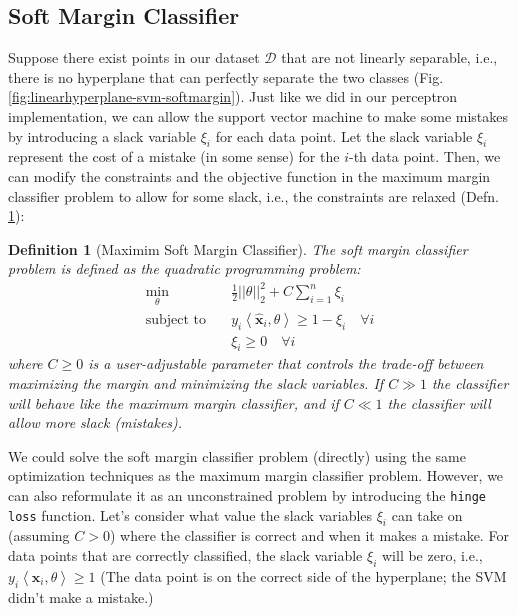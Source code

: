\documentclass{article}[11pt]
\newtheorem{defn}{Definition}
\newcommand{\norm}[1]{\left|\left|#1\right|\right|}
\begin{document}
\subsection{Soft Margin Classifier}\label{sec:soft-margin}
Suppose there exist points in our dataset $\mathcal{D}$ that are not linearly separable, i.e., there is no hyperplane that can perfectly separate the two classes (Fig. \ref{fig:linearhyperplane-svm-softmargin}).
Just like we did in our perceptron implementation, we can allow the support vector machine to make some mistakes by introducing a slack variable $\xi_{i}$ for each data point.
Let the slack variable $\xi_{i}$ represent the cost of a mistake (in some sense) for the $i$-th data point.
Then, we can modify the constraints and the objective function in the maximum margin classifier problem to allow for some slack, i.e., the constraints are relaxed (Defn. \ref{defn:soft-margin}):
\begin{mdframed}
\begin{defn}[Maximim Soft Margin Classifier]\label{defn:soft-margin}
The soft margin classifier problem is defined as the quadratic programming problem:
\begin{align*}
    \min_{\theta}\quad & \frac{1}{2}\norm{\theta}_{2}^{2} + C\sum_{i=1}^{n}\xi_{i}\\
    \text{subject to}\quad & y_{i}\left<\hat{\mathbf{x}}_{i},\theta\right> \geq 1 - \xi_{i}\quad\forall i\\
    & \xi_{i} \geq 0\quad\forall i
\end{align*}
where $C\geq{0}$ is a user-adjustable parameter that controls the trade-off between maximizing the margin and minimizing the slack variables.
If $C\gg{1}$ the classifier will behave like the maximum margin classifier, and if $C\ll{1}$ the classifier will allow more slack (mistakes).
\end{defn}
\end{mdframed}
We could solve the soft margin classifier problem (directly) using the same optimization techniques as the maximum margin classifier problem.
However, we can also reformulate it as an unconstrained problem by introducing the \texttt{hinge loss} function. 
Let's consider what value the slack variables $\xi_{i}$ can take on (assuming $C>{0}$) where the classifier is correct and when it makes a mistake.
For data points that are correctly classified, the slack variable $\xi_{i}$ will be zero, i.e., $y_{i}\left<\hat{\mathbf{x}}_{i},\theta\right> \geq 1$ 
(The data point is on the correct side of the hyperplane; the SVM didn't make a mistake.) 
\end{document}
